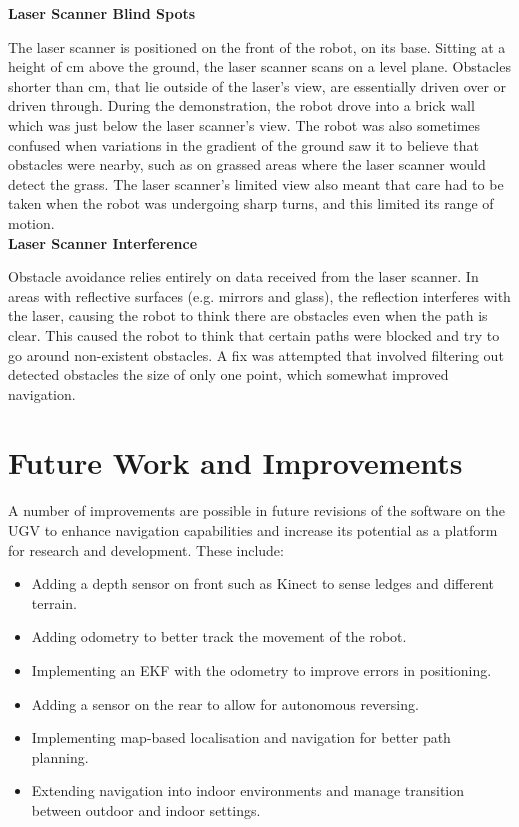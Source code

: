 \documentclass[titlepage,12pt,a4paper]{article}
\begin{document}
\textbf{Laser Scanner Blind Spots}

The laser scanner is positioned on the front of the robot, on its base. Sitting at a height of \unit[30]{cm} above the ground, the laser scanner scans on a level plane. Obstacles shorter than \unit[30]{cm}, that lie outside of the laser's view, are essentially driven over or driven through. During the demonstration, the robot drove into a brick wall which was just below the laser scanner's view. The robot was also sometimes confused when variations in the gradient of the ground saw it to believe that obstacles were nearby, such as on grassed areas where the laser scanner would detect the grass. The laser scanner's limited view also meant that care had to be taken when the robot was undergoing sharp turns, and this limited its range of motion.\\

\textbf{Laser Scanner Interference}

Obstacle avoidance relies entirely on data received from the laser scanner. In areas with reflective surfaces (e.g. mirrors and glass), the reflection interferes with the laser, causing the robot to think there are obstacles even when the path is clear. This caused the robot to think that certain paths were blocked and try to go around non-existent obstacles. A fix was attempted that involved filtering out detected obstacles the size of only one point, which somewhat improved navigation.

\pagebreak
\section{Future Work and Improvements}

A number of improvements are possible in future revisions of the software on the UGV to enhance navigation capabilities and increase its potential as a platform for research and development. These include:

\begin{itemize}
	\item Adding a depth sensor on front such as Kinect to sense ledges and different terrain.
	\item Adding odometry to better track the movement of the robot.
	\item Implementing an EKF with the odometry to improve errors in positioning.
	\item Adding a sensor on the rear to allow for autonomous reversing.
	\item Implementing map-based localisation and navigation for better path planning.
	\item Extending navigation into indoor environments and manage transition between outdoor and indoor settings.
\end{itemize}
\end{document}
